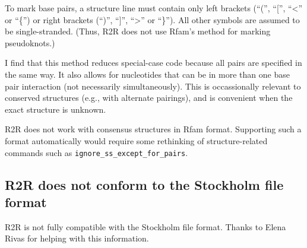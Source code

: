 \documentclass[letterpaper,12pt]{report}
\begin{document}
To mark base pairs, 
a structure line must contain only left
brackets (``('', ``['', ``\textless{}'' or ``\{'') or right brackets (``)'', ``]'', ``\textgreater{}'' or ``\}'').
All other symbols are assumed to be single-stranded.
(Thus, R2R does not use Rfam's method for marking pseudoknots.)

I find that this method reduces special-case code because all pairs are specified in the same way.
It also allows for nucleotides that can be in more than one base pair interaction (not necessarily simultaneously).
This is occassionally relevant to conserved structures (e.g., with alternate pairings), and is convenient
when the exact structure is unknown.

R2R does not work with consensus structures in Rfam format.
Supporting such a format automatically would require some rethinking of structure-related commands such
as {\tt ignore\_ss\_except\_for\_pairs}.

\subsection{R2R does not conform to the Stockholm file format}
\label{sec:notstockholm}

R2R is not fully compatible with the Stockholm file format.  Thanks to Elena Rivas for helping with this information.
\end{document}
